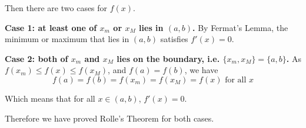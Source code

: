 Then there are two cases for $f(x)$.

\textbf{Case 1: at least one of $x_m$ or $x_M$ lies in $(a, b)$.}
By Fermat's Lemma, the minimum or maximum that lies in $(a, b)$ satisfies $f'(x) = 0$.

\textbf{Case 2: both of $x_m$ and $x_M$ lies on the boundary, i.e. $\{x_m, x_M\} = \{a, b\}$.}
As $f(x_m) \leq f(x) \leq f(x_M)$, and $f(a) = f(b)$, we have
$$ f(a) = f(b) = f(x_m) = f(x_M) = f(x) \text{ for all } x $$

Which means that for all $x \in (a, b)$, $f'(x) = 0$.

Therefore we have proved Rolle's Theorem for both cases.